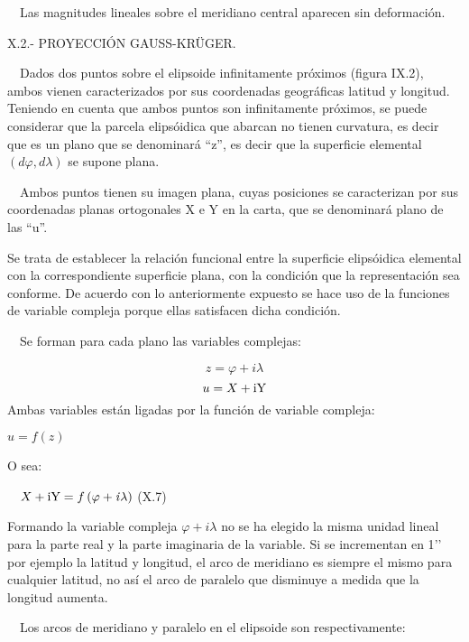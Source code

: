 \documentclass{tufte-book}
\newcommand\normalsubformula[1]{\text{\mathversion{normal}$#1$}}
\begin{document}
\ \ Las magnitudes lineales sobre el meridiano central aparecen sin
deformación.  

X.2.- PROYECCIÓN GAUSS-KR\"UGER.

\ \ Dados dos puntos sobre el elipsoide infinitamente próximos (figura
IX.2), ambos vienen caracterizados por sus coordenadas geográficas
latitud y longitud. Teniendo en cuenta que ambos puntos son
infinitamente próximos, se puede considerar que la parcela
elipsóidica que abarcan no tienen curvatura, es decir que es un plano
que se denominará {\textquotedblleft}z{\textquotedblright}, es decir
que la superficie elemental  ${\left(\mathit{d\varphi
},\mathit{d\lambda }\right)}$ se supone plana.

\ \ Ambos puntos tienen su imagen plana, cuyas posiciones se
caracterizan por sus coordenadas planas ortogonales X e Y en la carta,
que se denominará plano de las
{\textquotedblleft}u{\textquotedblright}.

Se trata de establecer la relación funcional entre la superficie
elipsóidica elemental con la correspondiente superficie plana, con la
condición que la representación sea conforme. De acuerdo con lo
anteriormente expuesto se hace uso de la funciones de variable compleja
porque ellas satisfacen dicha condición.

\ \ Se forman para cada plano las variables complejas:

\begin{equation*}
{z=\varphi +\mathit{i\lambda }}
\end{equation*}
\begin{equation*}
{u=X+\normalsubformula{\text{iY}}}
\end{equation*}
Ambas variables están ligadas por la función de variable compleja:

 ${u=f\left(z\right)}$

O sea:

\ \  ${X+\normalsubformula{\text{iY}}=f\left(\varphi +\mathit{i\lambda
}\right)}$  (X.7)

Formando la variable compleja  ${\varphi +\mathit{i\lambda }}$ no se ha
elegido la misma unidad lineal para la parte real y la parte imaginaria
de la variable. Si se incrementan en
1{\textquoteright}{\textquoteright} por ejemplo la latitud y longitud,
el arco de meridiano es siempre el mismo para cualquier latitud, no
así el arco de paralelo que disminuye a medida que la longitud
aumenta.

\ \ Los arcos de meridiano y paralelo en el elipsoide son
respectivamente:
\end{document}
